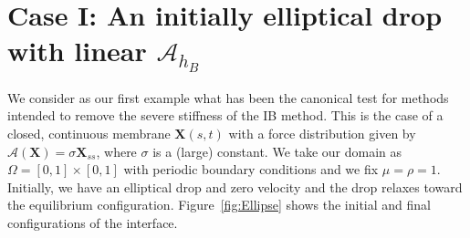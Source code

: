 \documentclass[preprint,12pt]{elsarticle}
\begin{document}
\section{Case I: An initially elliptical drop with linear $\mathcal{A}_{h_B}$}
\label{Sec:drop}
We consider as our first example what has been the canonical test for methods intended to remove the severe stiffness of the IB method. This is the case of a closed, continuous membrane $\mathbf{X}(s,t)$ with a force distribution given by $\mathcal{A}(\mathbf{X})=\sigma\mathbf{X}_{ss}$, where $\sigma$ is a (large) constant. We take our domain as $\Omega = [0,1]\times[0,1]$ with periodic boundary conditions and we fix $\mu=\rho=1$. Initially, we have an elliptical drop and zero velocity and the drop relaxes toward the equilibrium configuration. Figure~\ref{fig:Ellipse} shows the initial and final configurations of the interface.
\end{document}
